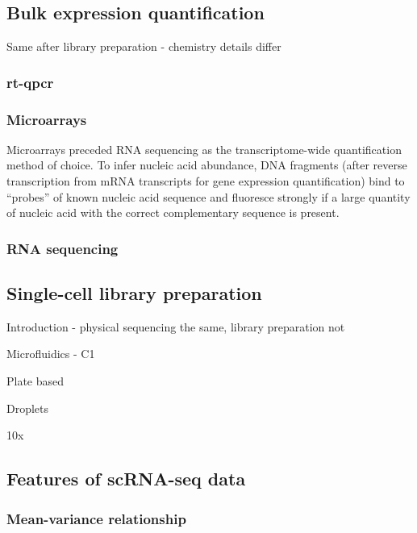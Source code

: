 \subsection{Bulk expression quantification}

Same after library preparation - chemistry details differ

\subsubsection{rt-qpcr}


\subsubsection{Microarrays}


Microarrays preceded RNA sequencing as the transcriptome-wide quantification method of choice. To infer nucleic acid abundance, DNA fragments (after reverse transcription from mRNA transcripts for gene expression quantification) bind to ``probes'' of known nucleic acid sequence and fluoresce strongly if a large quantity of nucleic acid with the correct complementary sequence is present.

\subsubsection{RNA sequencing}


\subsection{Single-cell library preparation} \label{sec:sc_lib_prep}

Introduction - physical sequencing the same, library preparation not

Microfluidics - C1

Plate based

Droplets

10x

\subsection{Features of scRNA-seq data}

\subsubsection{Mean-variance relationship}

